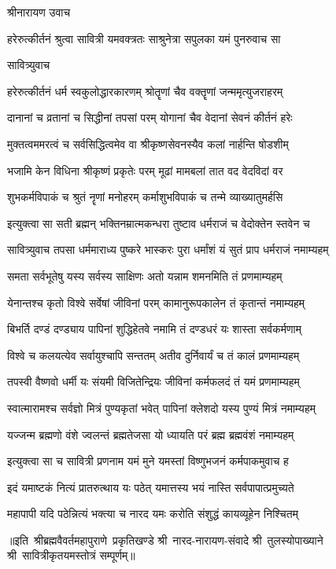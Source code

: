 
श्रीनारायण उवाच

\twolineshloka
{हरेरुत्कीर्तनं श्रुत्वा सावित्री यमवक्त्रतः}
{साश्रुनेत्रा सपुलका यमं पुनरुवाच सा}%

सावित्र्युवाच

\twolineshloka
{हरेरुत्कीर्तनं धर्म स्वकुलोद्धारकारणम्}
{श्रोतॄणां चैव वक्तॄणां जन्ममृत्युजराहरम्}%

\twolineshloka
{दानानां च व्रतानां च सिद्धीनां तपसां परम्}
{योगानां चैव वेदानां सेवनं कीर्तनं हरेः}%

\twolineshloka
{मुक्तत्वममरत्वं च सर्वसिद्धित्वमेव वा}
{श्रीकृष्णसेवनस्यैव कलां नार्हन्ति षोडशीम्}%

\twolineshloka
{भजामि केन विधिना श्रीकृष्णं प्रकृतेः परम्}
{मूढां मामबलां तात वद वेदविदां वर}%

\twolineshloka
{शुभकर्मविपाकं च श्रुतं नॄणां मनोहरम्}
{कर्माशुभविपाकं च तन्मे व्याख्यातुमर्हसि}%

\twolineshloka
{इत्युक्त्वा सा सती ब्रह्मन् भक्तिनम्रात्मकन्धरा}
{तुष्टाव धर्मराजं च वेदोक्तेन स्तवेन च}%

सावित्र्युवाच
\twolineshloka
{तपसा धर्ममाराध्य पुष्करे भास्करः पुरा}
{धर्मांशं यं सुतं प्राप धर्मराजं नमाम्यहम्}%

\twolineshloka
{समता सर्वभूतेषु यस्य सर्वस्य साक्षिणः}
{अतो यन्नाम शमनमिति तं प्रणमाम्यहम्}%

\twolineshloka
{येनान्तश्च कृतो विश्वे सर्वेषां जीविनां परम्}
{कामानुरूपकालेन तं कृतान्तं नमाम्यहम्}%

\twolineshloka
{बिभर्ति दण्डं दण्ड्याय पापिनां शुद्धिहेतवे}
{नमामि तं दण्डधरं यः शास्ता सर्वकर्मणाम्}%

\twolineshloka
{विश्वे च कलयत्येव सर्वायुश्चापि सन्ततम्}
{अतीव दुर्निवार्यं च तं कालं प्रणमाम्यहम्}%

\twolineshloka
{तपस्वी वैष्णवो धर्मी यः संयमी विजितेन्द्रियः}
{जीविनां कर्मफलदं तं यमं प्रणमाम्यहम्}%

\twolineshloka
{स्वात्मारामश्च सर्वज्ञो मित्रं पुण्यकृतां भवेत्}
{पापिनां क्लेशदो यस्य पुण्यं मित्रं नमाम्यहम्}%

\twolineshloka
{यज्जन्म ब्रह्मणो वंशे ज्वलन्तं ब्रह्मतेजसा}
{यो ध्यायति परं ब्रह्म ब्रह्मवंशं नमाम्यहम्}%

\twolineshloka
{इत्युक्त्वा सा च सावित्री प्रणनाम यमं मुने}
{यमस्तां विष्णुभजनं कर्मपाकमुवाच ह}%

\twolineshloka
{इदं यमाष्टकं नित्यं प्रातरुत्थाय यः पठेत्}
{यमात्तस्य भयं नास्ति सर्वपापात्प्रमुच्यते}%

\twolineshloka
{महापापी यदि पठेन्नित्यं भक्त्या च नारद}
{यमः करोति संशुद्धं कायव्यूहेन निश्चितम्}%

{॥इति~श्रीब्रह्मवैवर्तमहापुराणे~प्रकृतिखण्डे श्री~नारद-नारायण-संवादे श्री~तुलस्योपाख्याने श्री~सावित्रीकृतयमस्तोत्रं सम्पूर्णम्॥}